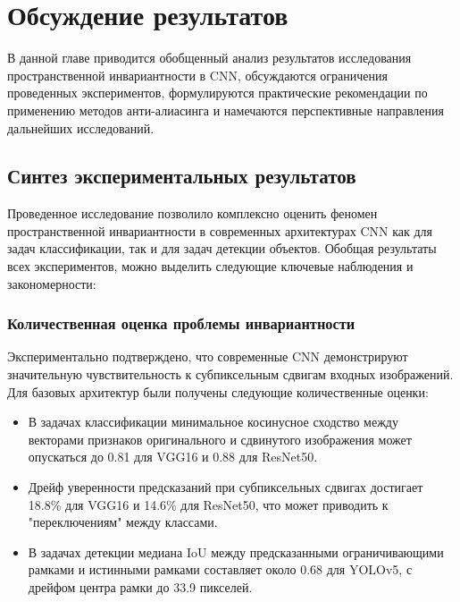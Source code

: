 \chapter{Обсуждение результатов} \label{discussion}

В данной главе приводится обобщенный анализ результатов исследования пространственной инвариантности в CNN, обсуждаются ограничения проведенных экспериментов, формулируются практические рекомендации по применению методов анти-алиасинга и намечаются перспективные направления дальнейших исследований.

\section{Синтез экспериментальных результатов}
\label{discussion:synthesis}

Проведенное исследование позволило комплексно оценить феномен пространственной инвариантности в современных архитектурах CNN как для задач классификации, так и для задач детекции объектов. Обобщая результаты всех экспериментов, можно выделить следующие ключевые наблюдения и закономерности:

\subsection{Количественная оценка проблемы инвариантности}
\label{discussion:synthesis:quantification}

Экспериментально подтверждено, что современные CNN демонстрируют значительную чувствительность к субпиксельным сдвигам входных изображений. Для базовых архитектур были получены следующие количественные оценки:

\begin{itemize}
    \item В задачах классификации минимальное косинусное сходство между векторами признаков оригинального и сдвинутого изображения может опускаться до 0.81 для VGG16 и 0.88 для ResNet50.
    
    \item Дрейф уверенности предсказаний при субпиксельных сдвигах достигает 18.8\% для VGG16 и 14.6\% для ResNet50, что может приводить к "переключениям" между классами.
    
    \item В задачах детекции медиана IoU между предсказанными ограничивающими рамками и истинными рамками составляет около 0.68 для YOLOv5, с дрейфом центра рамки до 33.9 пикселей.
\end{itemize}

